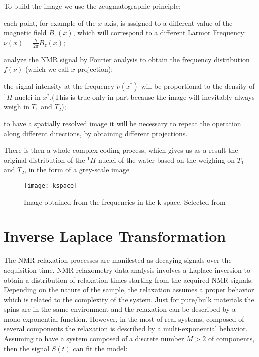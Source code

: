 \documentclass[a4paper,11pt]{report}
\begin{document}
To build the image we use the zeugmatographic principle:
\begin{list}{-}{}
	\item each point, for example of the $x$ axis, is assigned to a different value of the magnetic field $B_z(x)$, which will correspond to a different Larmor Frequency: $\nu(x)= \frac{\gamma}{2 \pi} B_z (x)$;
	\item analyze the NMR signal by Fourier analysis to obtain the frequency distribution $f(\nu)$ (which we call $x$-projection);
	\item the signal intensity at the frequency $\nu(x^*)$ will be proportional to the density of $^1H$ nuclei in $x^*$.(This is true only in part because the image will inevitably always weigh in $T_1$ and $T_2$);
	\item to have a spatially resolved image it will be necessary to repeat the operation along different directions, by obtaining different projections.
\end{list}

There is then a whole complex coding process, which gives us as a result the original distribution of the $^1H$ nuclei of the water based on the weighing on $T_1$ and $T_2$, in the form of a grey-scale image .  

\begin{figure}[h]
	\centering
	\texttt{[image: kspace]}
	\caption{Image obtained from the frequencies in the k-space. Selected from \cite{kspace}}\label{kspace}
\end{figure}



\section{Inverse Laplace Transformation}

The NMR relaxation processes are manifested as decaying signals over the acquisition time. NMR relaxometry data analysis involves a Laplace inversion to obtain a distribution of relaxation times starting from the acquired NMR signals.\\
Depending on the nature of the sample, the relaxation assumes a proper behavior which is related to the complexity of the system. Just for pure/bulk materials the spins are in the same environment and the relaxation can be described by a mono-exponential function. However, in the most of real systems, composed of several components the relaxation is described by a multi-exponential behavior. Assuming to have a system composed of a discrete number $M> 2$ of components, then the signal $S(t)$ can fit the model: 
\end{document}
